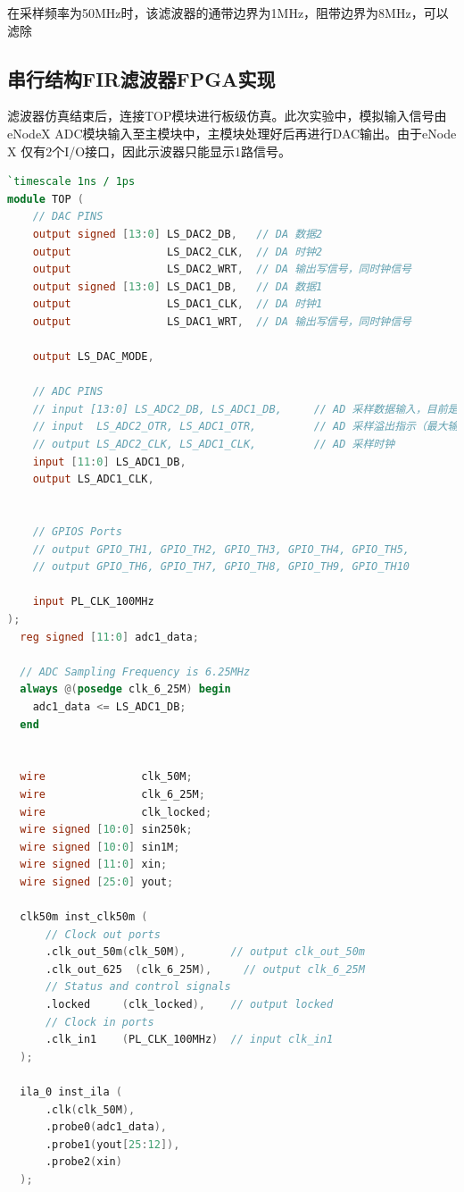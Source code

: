 在采样频率为50MHz时，该滤波器的通带边界为1MHz，阻带边界为8MHz，可以滤除
\subsection{串行结构FIR滤波器FPGA实现}
滤波器仿真结束后，连接TOP模块进行板级仿真。此次实验中，模拟输入信号由eNodeX ADC模块输入至主模块中，主模块处理好后再进行DAC输出。由于eNode X 仅有2个I/O接口，因此示波器只能显示1路信号。
\begin{lstlisting}[language=verilog,caption={TOP模块}]
`timescale 1ns / 1ps
module TOP (
    // DAC PINS
    output signed [13:0] LS_DAC2_DB,   // DA 数据2
    output               LS_DAC2_CLK,  // DA 时钟2
    output               LS_DAC2_WRT,  // DA 输出写信号，同时钟信号
    output signed [13:0] LS_DAC1_DB,   // DA 数据1
    output               LS_DAC1_CLK,  // DA 时钟1
    output               LS_DAC1_WRT,  // DA 输出写信号，同时钟信号

    output LS_DAC_MODE,

    // ADC PINS
    // input [13:0] LS_ADC2_DB, LS_ADC1_DB,     // AD 采样数据输入，目前是用的12bit ADC
    // input  LS_ADC2_OTR, LS_ADC1_OTR,         // AD 采样溢出指示（最大输入幅??2V??
    // output LS_ADC2_CLK, LS_ADC1_CLK,         // AD 采样时钟
    input [11:0] LS_ADC1_DB,
    output LS_ADC1_CLK,


    // GPIOS Ports
    // output GPIO_TH1, GPIO_TH2, GPIO_TH3, GPIO_TH4, GPIO_TH5,
    // output GPIO_TH6, GPIO_TH7, GPIO_TH8, GPIO_TH9, GPIO_TH10

    input PL_CLK_100MHz
);
  reg signed [11:0] adc1_data;

  // ADC Sampling Frequency is 6.25MHz
  always @(posedge clk_6_25M) begin
    adc1_data <= LS_ADC1_DB;
  end


  wire               clk_50M;
  wire               clk_6_25M;
  wire               clk_locked;
  wire signed [10:0] sin250k;
  wire signed [10:0] sin1M;
  wire signed [11:0] xin;
  wire signed [25:0] yout;

  clk50m inst_clk50m (
      // Clock out ports
      .clk_out_50m(clk_50M),       // output clk_out_50m
      .clk_out_625  (clk_6_25M),     // output clk_6_25M
      // Status and control signals
      .locked     (clk_locked),    // output locked
      // Clock in ports
      .clk_in1    (PL_CLK_100MHz)  // input clk_in1
  );

  ila_0 inst_ila (
      .clk(clk_50M),
      .probe0(adc1_data),
      .probe1(yout[25:12]),
      .probe2(xin)
  );




\end{lstlisting}
